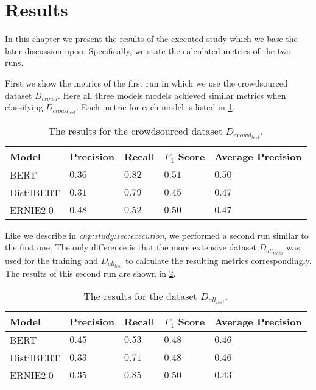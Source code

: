 \section{Results}
\label{chp:study:sec:results}
In this chapter we present the results of the executed study which we base the later discussion upon.
Specifically, we state the calculated metrics of the two runs.

First we show the metrics of the first run in which we use the crowdsourced dataset $D_{crowd}$.
Here all three models models achieved similar metrics when classifying $D_{crowd_{test}}$.
Each metric for each model is listed in \cref{tab:study:results:first_run}.
\begin{table}[htpb]
    \centering
    \begin{tabular}{l | l l l l }
        \toprule
         Model & Precision & Recall & $F_1$ Score & Average Precision \\
        \midrule
        \ac{BERT} & $0.36$ & $0.82$ & $0.51$ & $0.50$\\
        \ac{DistilBERT} & $0.31$ & $0.79$ & $0.45$ & $0.47$\\
        \ac{ERNIE2.0} & $0.48$ & $0.52$ & $0.50$ & $0.47$\\
        \bottomrule
    \end{tabular}
    \caption[Study Results on Crowdsourced Dataset]{The results for the crowdsourced dataset $D_{crowd_{test}}$.}\label{tab:study:results:first_run}
\end{table}

Like we describe in \textit{chp:study:sec:execution}, we performed a second run similar to the first one.
The only difference is that the more extensive dataset $D_{all_{train}}$ was used for the training and $D_{all_{test}}$ to calculate the resulting metrics correspondingly.
The results of this second run are shown in \cref{tab:study:results:second_run}.
\begin{table}[htpb]
    \centering
    \begin{tabular}{l | l l l l }
        \toprule
         Model & Precision & Recall & $F_1$ Score & Average Precision\\
        \midrule
        \ac{BERT} & $0.45$ & $0.53$ & $0.48$ & $0.46$\\
        \ac{DistilBERT} & $0.33$ & $0.71$ & $0.48$ & $0.46$\\
        \ac{ERNIE2.0} & $0.35$ & $0.85$ & $0.50$ & $0.43$\\
        \bottomrule
    \end{tabular}
    \caption[Study Results on Complete Dataset]{The results for the dataset $D_{all_{test}}$.}\label{tab:study:results:second_run}
\end{table}
